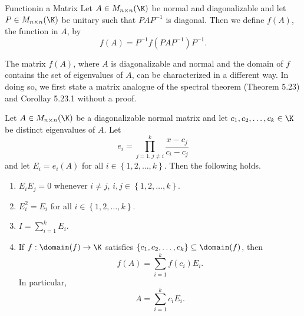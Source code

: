 \documentclass[linearalgebraII]{subfiles}
\begin{document}
    \begin{definition}{Function}{in a Matrix}
        Let $A\in M_{n\times n}(\K)$ be normal and diagonalizable and let $P\in M_{n\times n}(\K)$ be unitary such that $PAP^{-1}$ is diagonal. Then we define $f(A)$, the function in $A$, by
        \begin{equation*}
            f(A) = P^{-1}f\left( PAP^{-1} \right) P^{-1}.
        \end{equation*}
    \end{definition}

    \begin{remark}
        The matrix $f(A)$, where $A$ is diagonalizable and normal and the domain of $f$ contains the set of eigenvalues of $A$, can be characterized in a different way. In doing so, we first state a matrix analogue of the spectral theorem (Theorem 5.23) and Corollay 5.23.1 without a proof.
    \end{remark}

    \clearpage
    \begin{prop}{}
        Let $A\in M_{n\times n}(\K)$ be a diagonalizable normal matrix and let $c_1,c_2,\ldots,c_k\in\K$ be distinct eigenvalues of $A$. Let
        \begin{equation*}
            e_i = \prod^{k}_{j=1,j\neq i} \frac{x-c_j}{c_i-c_j}
        \end{equation*}
        and let $E_i = e_i(A)$ for all $i\in\left\lbrace 1,2,\ldots,k \right\rbrace$. Then the following holds.
        \begin{enumerate}
            \item $E_iE_j = 0$ whenever $i\neq j$, $i,j\in\left\lbrace 1,2,\ldots,k \right\rbrace$.
            \item $E_i^2 = E_i$ for all $i\in\left\lbrace 1,2,\ldots,k \right\rbrace$.
            \item $I = \sum^{k}_{i=1} E_i$.
            \item If $f:\domain(f)\to\K$ satisfies $\left\lbrace c_1,c_2,\ldots,c_k \right\rbrace\subseteq\domain(f)$, then
                \begin{equation*}
                    f(A) = \sum^{k}_{i=1} f\left( c_i \right) E_i.
                \end{equation*}
                In particular,
                \begin{equation*}
                    A = \sum^{k}_{i=1} c_iE_i.
                \end{equation*}
        \end{enumerate}
    \end{prop}
\end{document}
